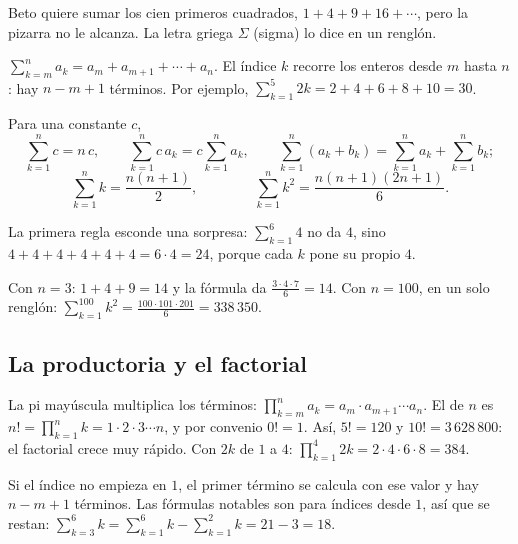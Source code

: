 \documentclass[11pt,a4paper]{article}
\begin{document}

Beto quiere sumar los cien primeros cuadrados, $1+4+9+16+\cdots$, pero la pizarra no le alcanza. La letra griega
$\Sigma$ (sigma) lo dice en un renglón.
\begin{figura}
\end{figura}

\begin{definicion}
$\displaystyle\sum_{k=m}^{n}a_k=a_m+a_{m+1}+\cdots+a_n$. El índice $k$ recorre los enteros desde $m$ hasta $n$:
hay $n-m+1$ términos. Por ejemplo, $\displaystyle\sum_{k=1}^{5}2k=2+4+6+8+10=30$.
\end{definicion}

\begin{propiedad}
Para una constante $c$,
\[ \sum_{k=1}^{n}c=n\,c,\qquad \sum_{k=1}^{n}c\,a_k=c\sum_{k=1}^{n}a_k,\qquad \sum_{k=1}^{n}(a_k+b_k)=\sum_{k=1}^{n}a_k+\sum_{k=1}^{n}b_k ; \]
\[ \sum_{k=1}^{n}k=\frac{n(n+1)}{2},\qquad\qquad \sum_{k=1}^{n}k^{2}=\frac{n(n+1)(2n+1)}{6}. \]
\end{propiedad}
La primera regla esconde una sorpresa: $\sum_{k=1}^{6}4$ no da $4$, sino $4+4+4+4+4+4=6\cdot4=24$, porque cada $k$
pone su propio $4$.
\begin{ejemplo}
Con $n=3$: $1+4+9=14$ y la fórmula da $\frac{3\cdot4\cdot7}{6}=14$. Con $n=100$, en un solo renglón:
$\sum_{k=1}^{100}k^{2}=\frac{100\cdot101\cdot201}{6}=338\,350$.
\end{ejemplo}

\subsection{La productoria y el factorial}
\begin{definicion}
La pi mayúscula multiplica los términos: $\prod_{k=m}^{n}a_k=a_m\cdot a_{m+1}\cdots a_n$. El  de
$n$ es $n!=\prod_{k=1}^{n}k=1\cdot2\cdot3\cdots n$, y por convenio $0!=1$. Así, $5!=120$ y $10!=3\,628\,800$: el
factorial crece muy rápido. Con $2k$ de $1$ a $4$: $\prod_{k=1}^{4}2k=2\cdot4\cdot6\cdot8=384$.
\end{definicion}
Si el índice no empieza en $1$, el primer término se calcula con ese valor y hay $n-m+1$ términos. Las fórmulas
notables son para índices desde $1$, así que se restan: $\sum_{k=3}^{6}k=\sum_{k=1}^{6}k-\sum_{k=1}^{2}k=21-3=18$.
\end{document}

